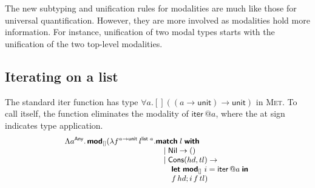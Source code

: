 \documentclass[sigplan, nonacm, natbib = false, review, screen]{acmart}
\newcommand{\keyw}[1]{{\textbf{{\textsf{#1}}}}}
\newcommand{\Met}{\textsc{Met}\xspace}
\newcommand{\MetlFrost}{\text{Frost-}\textsc{Metl}\xspace}
\newcommand{\MetlF}{\text{F-}\textsc{Metl}\xspace}
\newcommand{\todobox}[3]{{\todo[color=#1!20,bordercolor=#1!80]{%
  \begin{spacing}{0.9}\footnotesize\textbf{#2:} #3\end{spacing}}}}
\newcommand{\aghilas}[1]{\todobox{red}{Aghilas}{#1}}
\newcommand{\sam}[1]{\todobox{yellow}{Sam}{#1}}
\begin{document}

The new subtyping and unification rules for modalities are much like those for
universal quantification. However, they are more involved as modalities hold
more information. For instance, unification of two modal types starts with the
unification of the two top-level modalities.



%

\newcommand{\ba}{\begin{array}}
\newcommand{\ea}{\end{array}}

\newcommand{\bl}{\ba[t]{@{}l@{}}}
\newcommand{\el}{\ea}

\subsection{Iterating on a list}
The standard iter function has type $\forall a . []((a \to
\textsf{unit})\to \textsf{unit})$ in \Met. To call itself, the function
eliminates the modality of $\textsf{iter}\, @a$, where the at sign
indicates type application.
\[
\small
\bl
\Lambda a^{\textsf{Any}}.\,\keyw{mod}_{[]}
  (\lambda f^{a\to\textsf{unit}}\,l^{\textsf{list }a}.
  \bl
    \keyw{match}\; l \;\keyw{with} \\
    \quad
      \bl
      \mid \textsf{Nil} \to () \\
      \mid \textsf{Cons}(hd,tl) \to \\
      \quad
         \bl
         \keyw{let\;mod}_{[]}\; i = \textsf{iter}\, @a \;\keyw{in}\; \\
         f\,hd; i\,f\,tl)
         \el
      \el
  \el
\el
\]
\end{document}
